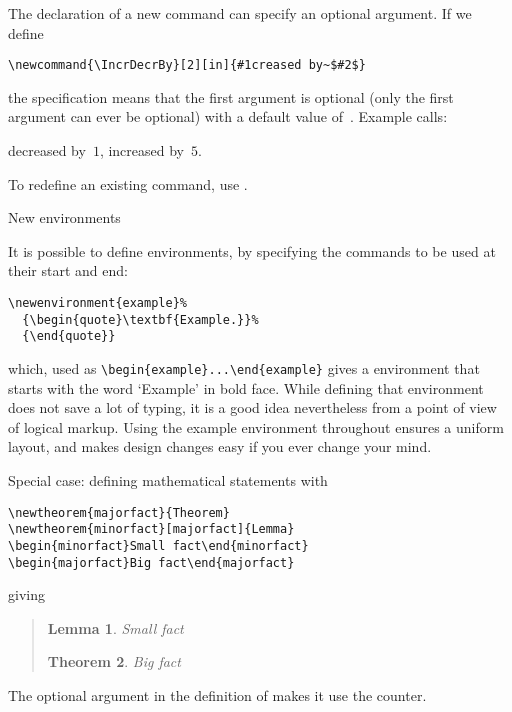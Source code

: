 The declaration of a new command can specify an optional argument.
If we define
\begin{verbatim}
\newcommand{\IncrDecrBy}[2][in]{#1creased by~$#2$}
\end{verbatim}
the \n{[in]} specification means that the first argument is optional
(only the first argument can ever be optional) with a default value
of~. Example calls:
\begin{examplewithcode}
\newcommand{\IncrDecrBy}[2][in]{#1creased by~$#2$}
\IncrDecrBy[de]{1}, \IncrDecrBy{5}.
\end{examplewithcode}

To redefine an existing command, use .

 {New environments}

It is possible to define environments, by specifying the commands to
be used at their start and end:
\begin{verbatim}
\newenvironment{example}%
  {\begin{quote}\textbf{Example.}}%
  {\end{quote}}
\end{verbatim}
which, used as \verb+\begin{example}...\end{example}+ gives a
 environment that starts with the word `Example' in bold
face. While defining that environment does not save a lot of typing,
it is a good idea nevertheless from a point of view of logical
markup. Using the example environment throughout ensures a uniform
layout, and makes design changes easy if you ever change your mind.

Special case: defining mathematical statements with
\begin{verbatim}
\newtheorem{majorfact}{Theorem}
\newtheorem{minorfact}[majorfact]{Lemma}
\begin{minorfact}Small fact\end{minorfact}
\begin{majorfact}Big fact\end{majorfact}
\end{verbatim}
giving
\begin{quote}
\newtheorem{majorfact}{Theorem}
\newtheorem{minorfact}[majorfact]{Lemma}
\begin{minorfact}Small fact\end{minorfact}
\begin{majorfact}Big fact\end{majorfact}
\end{quote}
The optional argument in the definition of  makes it use the
 counter.

